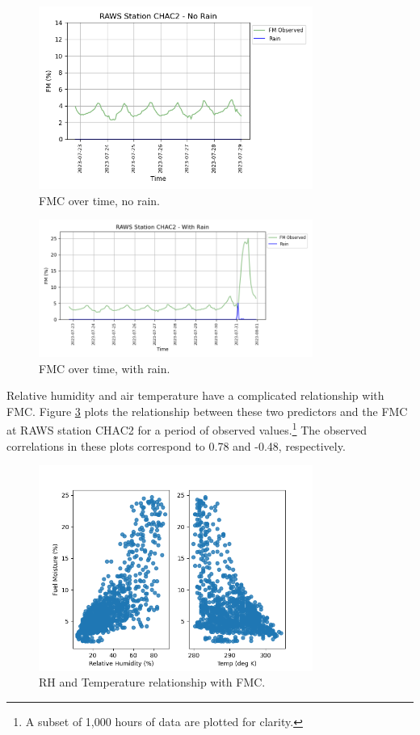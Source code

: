 \documentclass[11pt]{article}%
\begin{document}
\begin{figure}[ht]
    \centering
    \includegraphics[width=0.8\textwidth]{images/no_rain_plot.png}
    \caption{FMC over time, no rain.}
    \label{fig:fmc_no_rain}
\end{figure}

\begin{figure}[ht]
    \centering
    \includegraphics[width=0.8\textwidth]{images/rain_plot.png}
    \caption{FMC over time, with rain.}
    \label{fig:fmc_with_rain}
\end{figure}

Relative humidity and air temperature have a complicated relationship with FMC. Figure \ref{fig:rh_temp_plot} plots the relationship between these two predictors and the FMC at RAWS station CHAC2 for a period of observed values.\footnote{A subset of 1,000 hours of data are plotted for clarity.} The observed correlations in these plots correspond to 0.78 and -0.48, respectively. 

\begin{figure}[ht]
    \centering
    \includegraphics[width=0.8\textwidth]{images/rh_temp_plot.png}
    \caption{RH and Temperature relationship with FMC.}
    \label{fig:rh_temp_plot}
\end{figure}
\end{document}
